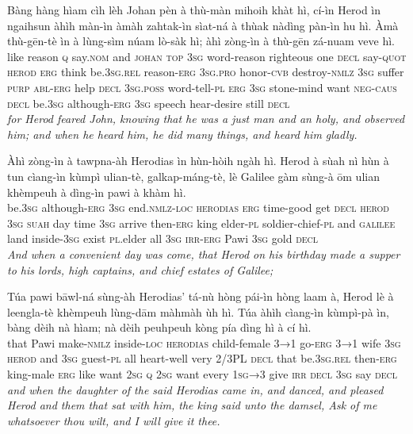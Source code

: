 \documentclass[11pt,a4paper]{article}
\begin{document}
\begin{exe}
\gll Bàng hàng hìam cìh lèh Johan pèn à thù-màn mihoih khàt hì, cí-ìn Herod ìn ngaihsun àhìh màn-ìn àmàh zahtak-ìn sìat-ná à thùak nàdìng pàn-ìn hu hì. Àmà thù-gēn-tè ìn à lùng-sìm núam lò-sàk hì; àhì zòng-ìn à thù-gēn zá-nuam veve hì. \\
     like reason \textsc{q} say.\textsc{nom} and \textsc{johan} \textsc{top} \textsc{3sg} word-reason righteous one \textsc{decl} say-\textsc{quot} \textsc{herod} \textsc{erg} think be.\textsc{3sg}.\textsc{rel} reason-\textsc{erg} \textsc{3sg}.\textsc{pro} honor-\textsc{cvb} destroy-\textsc{nmlz} \textsc{3sg} suffer \textsc{purp} \textsc{abl}-\textsc{erg} help \textsc{decl} \textsc{3sg}.\textsc{poss} word-tell-\textsc{pl} \textsc{erg} \textsc{3sg} stone-mind want \textsc{neg}-\textsc{caus} \textsc{decl} be.\textsc{3sg} although-\textsc{erg} \textsc{3sg} speech hear-desire still \textsc{decl} \\
\glt \textcolor{kjvcolor}{\textit{for Herod feared John, knowing that he was a just man and an holy, and observed him; and when he heard him, he did many things, and heard him gladly.}}

\gll Àhì zòng-ìn à tawpna-àh Herodias ìn hùn-hòih ngàh hì. Herod à sùah nì hùn à tun cìang-ìn kùmpì ulian-tè, galkap-máng-tè, lè Galilee gàm sùng-à ōm ulian khèmpeuh à dìng-ìn pawi à khàm hì. \\
     be.\textsc{3sg} although-\textsc{erg} \textsc{3sg} end.\textsc{nmlz}-\textsc{loc} \textsc{herodias} \textsc{erg} time-good get \textsc{decl} \textsc{herod} \textsc{3sg} \textsc{suah} day time \textsc{3sg} arrive then-\textsc{erg} king elder-\textsc{pl} soldier-chief-\textsc{pl} and \textsc{galilee} land inside-\textsc{3sg} exist \textsc{pl}.elder all \textsc{3sg} \textsc{irr}-\textsc{erg} Pawi \textsc{3sg} gold \textsc{decl} \\
\glt \textcolor{kjvcolor}{\textit{And when a convenient day was come, that Herod on his birthday made a supper to his lords, high captains, and chief estates of Galilee;}}

\gll Túa pawi bāwl-ná sùng-àh Herodias' tá-nù hòng pái-ìn hòng laam à, Herod lè à leengla-tè khèmpeuh lùng-dām màhmàh ùh hì. Túa àhìh cìang-ìn kùmpì-pà ìn, bàng dèih nà hìam; nà dèih peuhpeuh kòng pía dìng hì à cí hì. \\
     that Pawi make-\textsc{nmlz} inside-\textsc{loc} \textsc{herodias} child-female \textsc{3→1} go-\textsc{erg} \textsc{3→1} wife \textsc{3sg} \textsc{herod} and \textsc{3sg} guest-\textsc{pl} all heart-well very 2/3PL \textsc{decl} that be.\textsc{3sg}.\textsc{rel} then-\textsc{erg} king-male \textsc{erg} like want \textsc{2sg} \textsc{q} \textsc{2sg} want every \textsc{1sg→3} give \textsc{irr} \textsc{decl} \textsc{3sg} say \textsc{decl} \\
\glt \textcolor{kjvcolor}{\textit{and when the daughter of the said Herodias came in, and danced, and pleased Herod and them that sat with him, the king said unto the damsel, Ask of me whatsoever thou wilt, and I will give it thee.}}


\end{exe}
\end{document}
